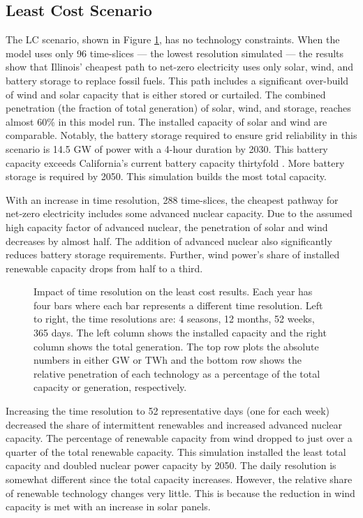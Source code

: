 \subsection{Least Cost Scenario}

The \gls{LC} scenario, shown in Figure \ref{fig:time_res_LC}, has no
technology constraints. When the model uses only 96 time-slices --- the lowest
resolution simulated --- the results show that Illinois' cheapest path to net-zero
electricity uses
only solar, wind, and battery storage to replace fossil fuels. This path includes
a significant over-build of wind and solar capacity that is either stored
or curtailed. The combined penetration (the fraction of total generation)
of solar, wind, and storage, reaches almost 60\% in this model run. The installed
capacity of solar and wind are comparable. Notably, the battery storage
required to ensure grid reliability in this scenario is 14.5 GW of power with
a 4-hour duration by 2030. This battery capacity exceeds California's current
battery capacity thirtyfold \cite{hutchins_us_2021}. More battery storage is
required by 2050. This simulation builds the most total capacity.

With an increase in time resolution, 288 time-slices, the cheapest pathway
for net-zero electricity includes some advanced nuclear capacity.
Due to the assumed high capacity factor of advanced nuclear, the penetration of
solar and wind decreases by almost half. The addition of advanced nuclear also significantly
reduces battery storage requirements. Further, wind power's share of installed renewable
capacity drops from half to a third.

\begin{figure}[H]
  \centering
  \resizebox{0.95\columnwidth}{!}{}
  \caption{Impact of time resolution on the least cost results. Each year has four bars where
  each bar represents a different time resolution. Left to right, the time resolutions are: 4
  seasons, 12 months, 52 weeks, 365 days.
  The left column shows the installed capacity and the right column shows the
  total generation. The top row plots the absolute numbers in either GW or TWh
  and the bottom row shows the relative penetration of each technology as a
  percentage of the total capacity or generation, respectively.}
  \label{fig:time_res_LC}
\end{figure}

Increasing the time resolution to 52 representative days (one for
each week) decreased the share of intermittent renewables and increased advanced
nuclear capacity. The percentage of renewable capacity from wind dropped to
just over a quarter of the total renewable capacity. This simulation installed
the least total capacity and doubled nuclear power capacity by 2050.
The daily resolution is somewhat different since the total capacity increases.
However, the relative share of renewable technology changes very little. This is
because the reduction in wind capacity is met with an increase in solar
panels.

